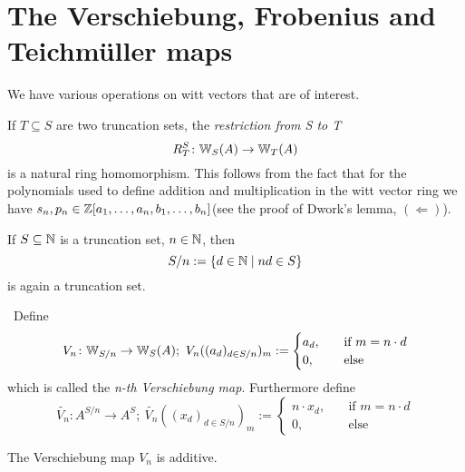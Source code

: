 \section{The Verschiebung, Frobenius and Teichmüller maps}
We have various operations on witt vectors that are of interest.
\begin{definition}
    If $T \subseteq S$ are two truncation sets, the \textit{restriction from S to T}
    \[
      R_T^S \colon \mathbb{W}_S(A) \to \mathbb{W}_T(A)  
    \]
    is a natural ring homomorphism. This follows from the fact that
    for the polynomials used to define addition and multiplication in the witt vector ring
    we have $s_n,p_n \in \mathbb{Z}[a_1,\dots,a_n,b_1,\dots,b_n]$(see the proof of Dwork's lemma, $(\Leftarrow)$).
\end{definition}
If $S\subseteq \mathbb{N}$ is a truncation set, $n \in \mathbb{N}$, then
\[
   S/n := \{d \in \mathbb{N} \mid nd \in S\}
\]
is again a truncation set.
\begin{definition}[Verschiebung] \
    Define 
    \[
        V_n \colon \mathbb{W}_{S/n} \to \mathbb{W}_S(A);\  
        V_n((a_d)_{d \in S/n})_m := 
        \begin{cases}
            a_d, &\quad \text{if $m=n \cdot d$} \\
            0,  &\quad \text{else}
        \end{cases}
    \]
    which is called the \textit{n-th Verschiebung map}. Furthermore define
    \[
        \widetilde{V_n} \colon A^{S/n} \to A^S;\ 
        \widetilde{V_n}((x_d)_{d \in S/n})_m := 
        \begin{cases}
            n \cdot x_d, &\quad \text{if $m=n \cdot d$} \\
            0,  &\quad \text{else}
        \end{cases}
    \]
\end{definition}
\begin{lemma} \label{lem: verschiebung is additive}
    The Verschiebung map $V_n$ is additive.
\end{lemma}
